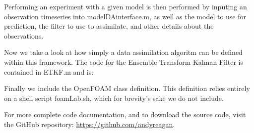 Performing an experiment with a given model is then performed by inputing an observation timeseries into modelDAinterface.m, as well as the model to use for prediction, the filter to use to assimilate, and other details about the observations.

{\scriptsize }

Now we take a look at how simply a data assimilation algoritm can be defined within this framework.
The code for the Ensemble Transform Kalman Filter is contained in ETKF.m and is:

{\scriptsize }

Finally we include the OpenFOAM class definition.
This definition relies entirely on a shell script foamLab.sh, which for brevity's sake we do not include.

{\scriptsize }

For more complete code documentation, and to download the source code, visit the GitHub repository: \url{https://github.com/andyreagan}.










